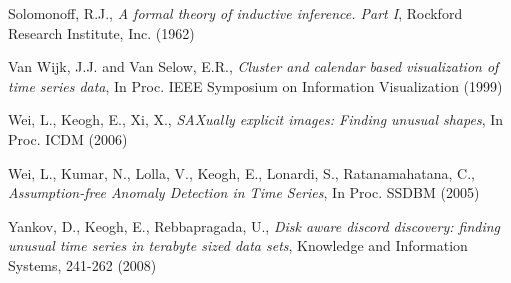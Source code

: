 \documentclass{sig-alternate}
\begin{document}
\begin{thebibliography}{99}
Solomonoff, R.J.,
{\em A formal theory of inductive inference. Part I},
Rockford Research Institute, Inc. (1962)

Van Wijk, J.J. and Van Selow, E.R., 
{\em Cluster and calendar based visualization of time series data},
In Proc. IEEE Symposium on Information Visualization (1999)

Wei, L., Keogh, E., Xi, X.,
{\em SAXually explicit images: Finding unusual shapes},
In Proc. ICDM (2006)

Wei, L., Kumar, N., Lolla, V., Keogh, E., Lonardi, S., Ratanamahatana, C.,
{\em Assumption-free Anomaly Detection in Time Series},
In Proc. SSDBM (2005)

Yankov, D., Keogh, E., Rebbapragada, U.,
{\em Disk aware discord discovery: finding unusual time series in terabyte sized data sets},
Knowledge and Information Systems, 241-262 (2008)

\end{thebibliography}
\end{document}
